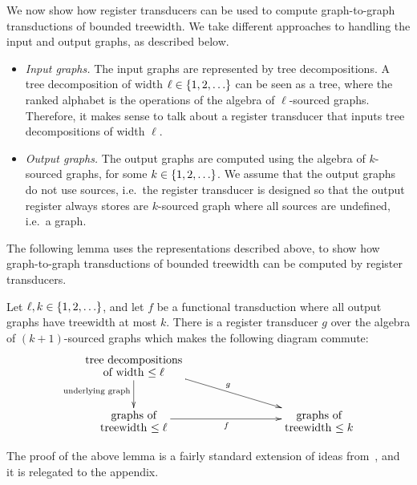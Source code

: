 We now show how register transducers can be used to compute graph-to-graph \mso transductions of bounded treewidth. We take different approaches to handling the input and output graphs, as described below.
\begin{itemize}
    \item \emph{Input graphs.} The input graphs are represented by tree decompositions. A tree decomposition of width $\ell \in \{1,2,\ldots\}$ can be seen as a tree, where the ranked alphabet is the operations of the algebra of $\ell$-sourced graphs.  Therefore, it makes sense to talk about a register transducer that inputs tree decompositions of width $\ell$. 
    \item \emph{Output graphs.} The output graphs are computed using the algebra of $k$-sourced graphs, for some $k \in \{1,2,\ldots\}$. We assume that the output graphs do not use sources, i.e.~the register transducer is designed so that the output register always stores are $k$-sourced graph where all sources are undefined, i.e.~a graph.
\end{itemize}

The following lemma uses the representations described above, to show how graph-to-graph \mso transductions of bounded treewidth can be computed by register transducers. 

\begin{lemma}\label{lem:transduction-to-registers}
    Let $\ell, k \in \{1,2,\ldots\}$, and  let $f$ be a functional \mso transduction where all output graphs have treewidth at most $k$. There is a  register transducer $g$ over the algebra of $(k+1)$-sourced graphs which makes the following diagram commute:
    \begin{align*}
    \xymatrix@C=3cm{
        \txt{tree decompositions\\ of width $\le \ell$}
        \ar[d]_{\txt{\scriptsize underlying graph}}
         \ar[dr]^g \\
        \txt{graphs of\\ treewidth $\le \ell$}\ar[r]_f &
        \txt{graphs  of\\ treewidth $\le k$} 
    }
    \end{align*}
\end{lemma}
The proof of the above lemma is a fairly standard extension of ideas from~\cite{courcelleMonadicSecondorderLogic1990,bloem_comparison_2000,alurStreamingTreeTransducers2017}, and it is relegated to the appendix. 

